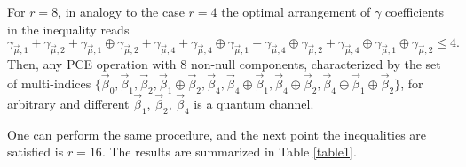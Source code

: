 For $r=8$, in analogy to the case $r=4$ the optimal arrangement of $\gamma$ coefficients in the inequality reads
% 
\begin{equation}
 \gamma_{\vec{\mu}, 1} + \gamma_{\vec{\mu}, 2} + \gamma_{\vec{\mu}, 1}\oplus\gamma_{\vec{\mu}, 2} +\gamma_{\vec{\mu}, 4} + \gamma_{\vec{\mu}, 4}\oplus\gamma_{\vec{\mu}, 1} + \gamma_{\vec{\mu}, 4}\oplus\gamma_{\vec{\mu}, 2} + \gamma_{\vec{\mu}, 4}\oplus\gamma_{\vec{\mu}, 1}\oplus\gamma_{\vec{\mu}, 2}\leq 4.
\label{Eq13}
 \end{equation}
%
Then, any PCE operation with 8 non-null components, characterized by the set of multi-indices $\{\vec{\beta}_{0},\vec{\beta}_{1},\vec{\beta}_{2},\vec{\beta}_{1}\oplus\vec{\beta}_{2},\vec{\beta}_{4},\vec{\beta}_{4}\oplus\vec{\beta}_{1},\vec{\beta}_{4}\oplus\vec{\beta}_{2},\vec{\beta}_{4}\oplus\vec{\beta}_{1}\oplus\vec{\beta}_{2}\}$, for arbitrary and different $\vec{\beta}_{1}$, $\vec{\beta}_{2}$, $\vec{\beta}_{4}$ is a quantum channel.

One can perform the same procedure, and the next point the inequalities are satisfied is $r=16$. The results are summarized in Table \ref{table1}.


